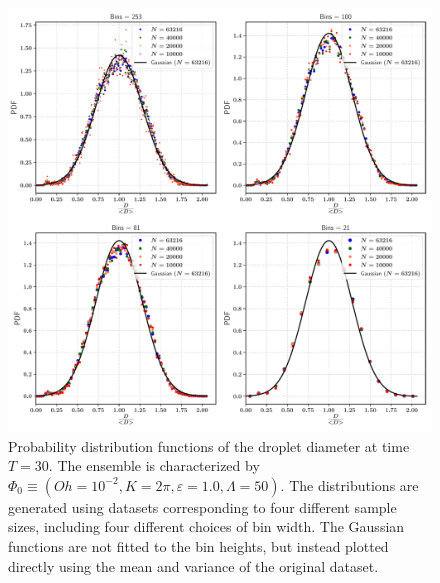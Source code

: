 

\begin{figure}
\centering
\includegraphics{plots/drop_stats/long_time_diameter_bins.pdf}
\caption{Probability distribution functions of the droplet diameter at time $T = 30$. 
The ensemble is characterized by $\Phi_0 \equiv \left( Oh = 10^{-2}, K = 2\pi , \varepsilon = 1.0 , \Lambda = 50 \right)$. The distributions are generated using datasets corresponding to four different sample sizes, including four different choices of bin width. The Gaussian functions are not fitted to the bin heights, but instead plotted directly using the mean and variance of the original dataset.}
\label{t2_dia_bins}
\end{figure}



